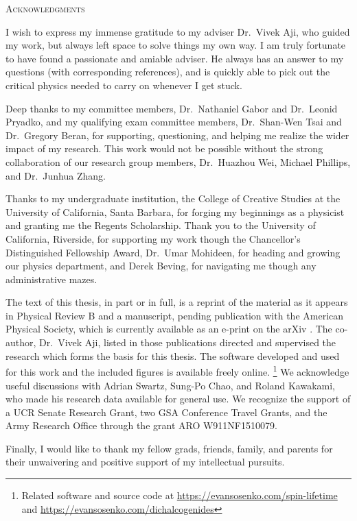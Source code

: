 \clearpage
\centering
\vspace*{-\toptafiddle}

\textsc{Acknowledgments}

\justify{}
\DoubleSpacing{}
I wish to express my immense gratitude to my adviser Dr.\ Vivek Aji,
who guided my work, but always left space to solve things my own way.
I am truly fortunate to have found a passionate and amiable adviser.
He always has an answer to my questions (with corresponding references),
and is quickly able to pick out the critical physics
needed to carry on whenever I get stuck.

Deep thanks to my committee members,
Dr.\ Nathaniel Gabor and Dr.\ Leonid Pryadko,
and my qualifying exam committee members,
Dr.\ Shan-Wen Tsai and Dr.\ Gregory Beran,
for supporting, questioning,
and helping me realize the wider impact of my research.
This work would not be possible without the strong collaboration
of our research group members, Dr.\ Huazhou Wei, Michael Phillips,
and Dr.\ Junhua Zhang.

Thanks to my undergraduate institution,
the College of Creative Studies at
the University of California, Santa Barbara,
for forging my beginnings as a physicist
and granting me the Regents Scholarship.
Thank you to the University of California, Riverside,
for supporting my work though the
Chancellor's Distinguished Fellowship Award,
Dr.\ Umar Mohideen, for heading and growing our physics department,
and Derek Beving, for navigating me though any administrative mazes.

The text of this thesis, in part or in full,
is a reprint of the material as it appears in
Physical Review B
\cite{PhysRevB.89.245436}
and a manuscript, pending publication with the American Physical Society,
which is currently available as an e-print on the arXiv
\cite{1512.01261v2}.
The co-author, Dr.\ Vivek Aji, listed in those publications
directed and supervised the research which forms the basis for this thesis.
The software developed
and used
\cite{Hunter:2007} for this work
and the included figures is available freely online.%
\footnote{%
  Related software and source code at
  \url{https://evansosenko.com/spin-lifetime}
  and \url{https://evansosenko.com/dichalcogenides}
}
We acknowledge useful discussions with
Adrian Swartz, Sung-Po Chao, and Roland Kawakami,
who made his research data available for general use.
We recognize the support of a UCR Senate Research Grant,
two GSA Conference Travel Grants,
and the Army Research Office through the grant
ARO W911NF1510079.

Finally, I would like to thank my fellow grads, friends, family, and parents
for their unwaivering and positive support of my intellectual pursuits.
\enlargethispage{\bottafiddle}
\clearpage
